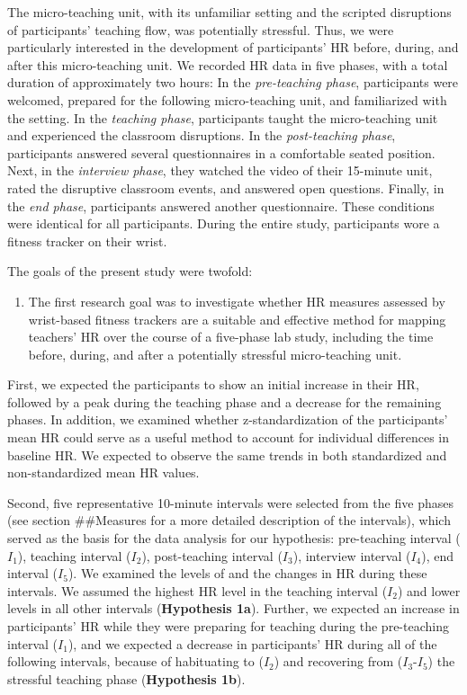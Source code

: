 \documentclass[preprint, 3p,
authoryear]{elsarticle} %
\providecommand{\tightlist}{%
  \setlength{\itemsep}{0pt}\setlength{\parskip}{0pt}}
\begin{document}
The micro-teaching unit, with its unfamiliar setting and the scripted
disruptions of participants' teaching flow, was potentially stressful.
Thus, we were particularly interested in the development of
participants' HR before, during, and after this micro-teaching unit. We
recorded HR data in five phases, with a total duration of approximately
two hours: In the \emph{pre-teaching phase}, participants were welcomed,
prepared for the following micro-teaching unit, and familiarized with
the setting. In the \emph{teaching phase}, participants taught the
micro-teaching unit and experienced the classroom disruptions. In the
\emph{post-teaching phase}, participants answered several questionnaires
in a comfortable seated position. Next, in the \emph{interview phase},
they watched the video of their 15-minute unit, rated the disruptive
classroom events, and answered open questions. Finally, in the \emph{end
phase}, participants answered another questionnaire. These conditions
were identical for all participants. During the entire study,
participants wore a fitness tracker on their wrist.

The goals of the present study were twofold:

\begin{enumerate}
\def\labelenumi{(\arabic{enumi})}
\tightlist
\item
  The first research goal was to investigate whether HR measures
  assessed by wrist-based fitness trackers are a suitable and effective
  method for mapping teachers' HR over the course of a five-phase lab
  study, including the time before, during, and after a potentially
  stressful micro-teaching unit.
\end{enumerate}

First, we expected the participants to show an initial increase in their
HR, followed by a peak during the teaching phase and a decrease for the
remaining phases. In addition, we examined whether z-standardization of
the participants' mean HR could serve as a useful method to account for
individual differences in baseline HR. We expected to observe the same
trends in both standardized and non-standardized mean HR values.

Second, five representative 10-minute intervals were selected from the
five phases (see section \#\#Measures for a more detailed description of
the intervals), which served as the basis for the data analysis for our
hypothesis: pre-teaching interval (\(I_1\)), teaching interval
(\(I_2\)), post-teaching interval (\(I_3\)), interview interval
(\(I_4\)), end interval (\(I_5\)). We examined the levels of and the
changes in HR during these intervals. We assumed the highest HR level in
the teaching interval (\(I_2\)) and lower levels in all other intervals
(\textbf{Hypothesis 1a}). Further, we expected an increase in
participants' HR while they were preparing for teaching during the
pre-teaching interval (\(I_1\)), and we expected a decrease in
participants' HR during all of the following intervals, because of
habituating to (\(I_2\)) and recovering from (\(I_3\)-\(I_5\)) the
stressful teaching phase (\textbf{Hypothesis 1b}).
\end{document}
